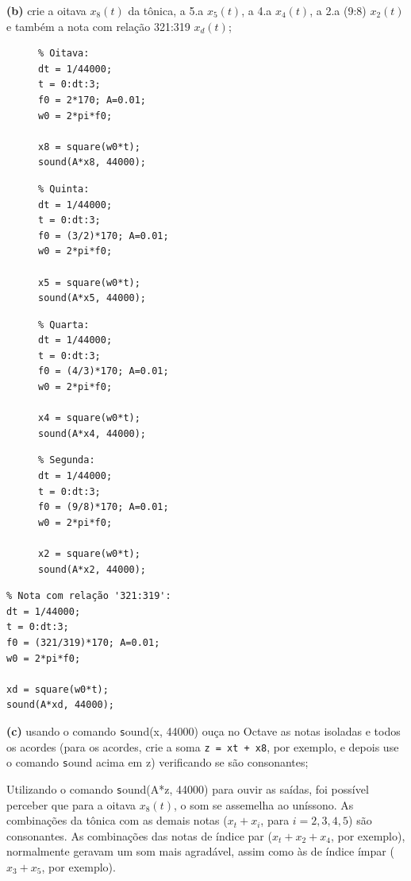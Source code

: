 \documentclass[10pt, a4paper]{article}
\begin{document}
{\textbf{(b)}} crie a oitava $x_{8}(t)$ da tônica, a 5.a $x_{5}(t)$, a 4.a $x_{4}(t)$, a 2.a (9:8) $x_{2}(t)$ e também a nota com relação 321:319 $x_{d}(t)$;
\begin{figure}[h]
\begin{minipage}[!]{0.24\linewidth}
\begin{verbatim}
% Oitava:
dt = 1/44000;
t = 0:dt:3;
f0 = 2*170; A=0.01;
w0 = 2*pi*f0;

x8 = square(w0*t);
sound(A*x8, 44000);
\end{verbatim}
\end{minipage}
\begin{minipage}[!]{0.25\linewidth}
\begin{verbatim}
% Quinta:
dt = 1/44000;
t = 0:dt:3;
f0 = (3/2)*170; A=0.01;
w0 = 2*pi*f0;

x5 = square(w0*t);
sound(A*x5, 44000);
\end{verbatim}
\end{minipage}
\begin{minipage}[!]{0.25\linewidth}
\begin{verbatim}
% Quarta:
dt = 1/44000;
t = 0:dt:3;
f0 = (4/3)*170; A=0.01;
w0 = 2*pi*f0;

x4 = square(w0*t);
sound(A*x4, 44000);
\end{verbatim}
\end{minipage}
\begin{minipage}[!]{0.24\linewidth}
\begin{verbatim}
% Segunda:
dt = 1/44000;
t = 0:dt:3;
f0 = (9/8)*170; A=0.01;
w0 = 2*pi*f0;

x2 = square(w0*t);
sound(A*x2, 44000);
\end{verbatim}
\end{minipage}

\end{figure}

\begin{verbatim}
% Nota com relação '321:319':
dt = 1/44000;
t = 0:dt:3;
f0 = (321/319)*170; A=0.01;
w0 = 2*pi*f0;

xd = square(w0*t);
sound(A*xd, 44000);
\end{verbatim}

{\textbf{(c)}} usando o comando {\texttt sound(x, 44000)} ouça no Octave as notas isoladas e todos os acordes (para os acordes, crie a soma {\texttt{z = xt + x8}}, por exemplo, e depois use o comando {\texttt sound} acima em z) verificando se são consonantes;

Utilizando o comando {\texttt sound(A*z, 44000)} para ouvir as saídas, foi possível perceber que para a oitava $x_{8}(t)$, o som se assemelha ao uníssono. As combinações da tônica com as demais notas ($x_{t} + x_{i}$, para $i = 2, 3, 4, 5$) são consonantes. As combinações das notas de índice par ($x_{t} + x_{2} + x_{4}$, por exemplo), normalmente geravam um som mais agradável, assim como às de índice ímpar ($x_{3} + x_{5}$, por exemplo).
\end{document}
